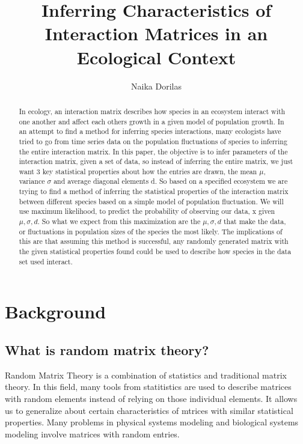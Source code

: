 \documentclass{article}
\begin{document}
\title{Inferring Characteristics of Interaction Matrices in an Ecological Context{}}
\author{Naika Dorilas}

\maketitle

\begin{abstract}
In ecology, an interaction matrix describes how species in an ecosystem interact with one another and affect each others growth in a given model of population growth. In an attempt to find a method for inferring species interactions, many ecologists have tried to go from time series data on the population fluctuations of species to inferring the entire interaction matrix. In this paper, the objective is to infer parameters of the interaction matrix, given a set of data, so instead of inferring the entire matrix, we just want 3 key statistical properties about how the entries are drawn, the mean $\mu$, variance $\sigma$ and average diagonal elements d. So based on a specified ecosystem we are trying to find a method of inferring the statistical properties of the interaction matrix between different species based on a simple model of population fluctuation. We will use maximum likelihood, to predict the probability of observing our data, x given $\mu, \sigma, d$. So what we expect from this maximization are the $\mu,\sigma,d$ that make the data, or fluctuations in population sizes of the species the most likely. The implications of this are that assuming this method is successful, any randomly generated matrix with the given statistical properties found could be used to describe how species in the data set used interact.
\end{abstract}

\section{Background}

\subsection{What is random matrix theory?}
\hfill\break
Random Matrix Theory is a combination of statistics and traditional matrix theory. In this field, many tools from statitistics are used to describe matrices with random elements instead of relying on those individual elements. It allows us to generalize about certain characteristics of mtrices with similar statistical properties. Many problems in physical systems modeling and biological systems modeling involve matrices with random entries. \hfill\break
\end{document}
